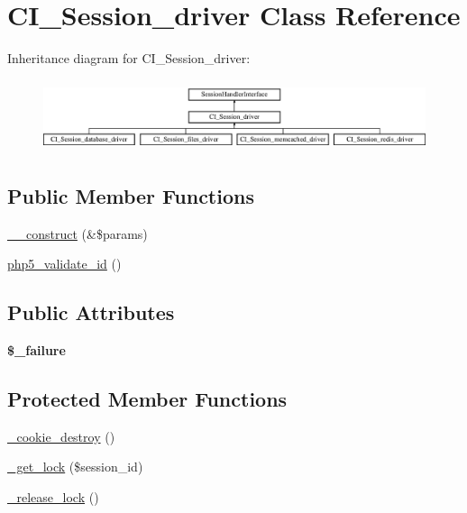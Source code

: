 \hypertarget{class_c_i___session__driver}{}\section{C\+I\+\_\+\+Session\+\_\+driver Class Reference}
\label{class_c_i___session__driver}
Inheritance diagram for C\+I\+\_\+\+Session\+\_\+driver\+:\begin{figure}[H]
\begin{center}
\leavevmode
\includegraphics[height=2.121212cm]{class_c_i___session__driver}
\end{center}
\end{figure}
\subsection*{Public Member Functions}
\begin{DoxyCompactItemize}
\item 
\mbox{\hyperlink{class_c_i___session__driver_afa22ae0e78b82ad90c5a3a812a582d93}{\+\_\+\+\_\+construct}} (\&\$params)
\item 
\mbox{\hyperlink{class_c_i___session__driver_a718760da63eb472c10d6c2a48fe39cd1}{php5\+\_\+validate\+\_\+id}} ()
\end{DoxyCompactItemize}
\subsection*{Public Attributes}
\begin{DoxyCompactItemize}
\item 
\mbox{\label{class_c_i___session__driver_ab7a440d6b7a814bf6179e1f03ce4c8f3}} 
{\bfseries \$\+\_\+failure}
\end{DoxyCompactItemize}
\subsection*{Protected Member Functions}
\begin{DoxyCompactItemize}
\item 
\mbox{\hyperlink{class_c_i___session__driver_ae5e9ee5230b7c36a93591df8192169ce}{\+\_\+cookie\+\_\+destroy}} ()
\item 
\mbox{\hyperlink{class_c_i___session__driver_a18248b58343fd8e63a9538fc7d478a49}{\+\_\+get\+\_\+lock}} (\$session\+\_\+id)
\item 
\mbox{\hyperlink{class_c_i___session__driver_a411934e8312e6c66f0c6a398c8dfe7b4}{\+\_\+release\+\_\+lock}} ()
\end{DoxyCompactItemize}
